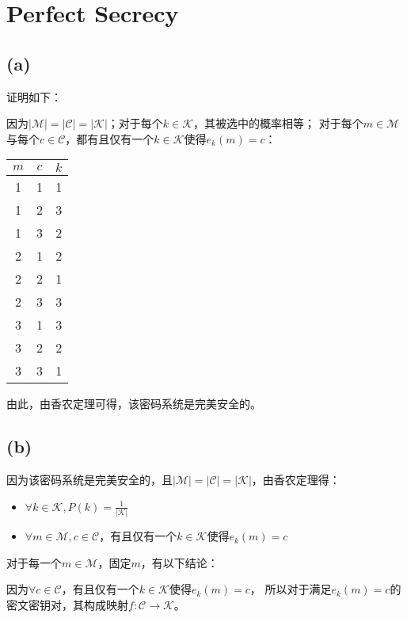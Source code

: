\documentclass[twoside,11pt]{article}
\begin{document}
\section{Perfect Secrecy}
\subsection*{(a)}
证明如下：

因为$|\mathcal{M}| = |\mathcal{C}| = |\mathcal{K}|$；对于每个$k \in \mathcal{K}$，其被选中的概率相等；
对于每个$m \in \mathcal{M}$与每个$c \in \mathcal{C}$，都有且仅有一个$k \in \mathcal{K}$使得$e_k(m) = c$：
\begin{center}
    \begin{tabular}{|c|c|c|}
        \hline
        $m$ & $c$ & $k$ \\
        \hline
        1   & 1   & 1   \\
        1   & 2   & 3   \\
        1   & 3   & 2   \\
        2   & 1   & 2   \\
        2   & 2   & 1   \\
        2   & 3   & 3   \\
        3   & 1   & 3   \\
        3   & 2   & 2   \\
        3   & 3   & 1   \\
        \hline
    \end{tabular}
\end{center}

由此，由香农定理可得，该密码系统是完美安全的。

\subsection*{(b)}
因为该密码系统是完美安全的，且$|\mathcal{M}| = |\mathcal{C}| = |\mathcal{K}|$，由香农定理得：
\begin{itemize}
    \item $\forall k \in \mathcal{K}, P(k)=\frac{1}{|\mathcal{K}|}$
    \item $\forall m \in \mathcal{M}, c \in \mathcal{C}$，有且仅有一个$k \in \mathcal{K}$使得$e_k(m) = c$
\end{itemize}

对于每一个$m \in \mathcal{M}$，固定$m$，有以下结论：

因为$\forall c \in \mathcal{C}$，有且仅有一个$k \in \mathcal{K}$使得$e_k(m) = c$，
所以对于满足$e_k(m) = c$的密文密钥对，其构成映射$f: \mathcal{C} \to \mathcal{K}$。
\end{document}
